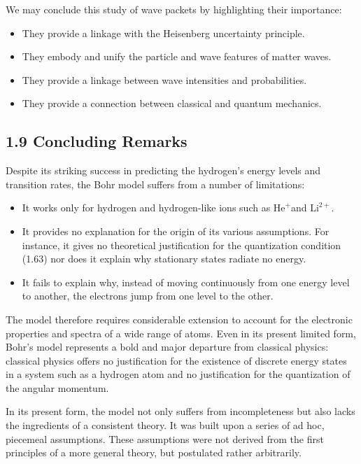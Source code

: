 \documentclass[10pt]{article}
\begin{document}
We may conclude this study of wave packets by highlighting their importance:

\begin{itemize}
  \item They provide a linkage with the Heisenberg uncertainty principle.
  \item They embody and unify the particle and wave features of matter waves.
  \item They provide a linkage between wave intensities and probabilities.
  \item They provide a connection between classical and quantum mechanics.
\end{itemize}

\subsection*{1.9 Concluding Remarks}
Despite its striking success in predicting the hydrogen's energy levels and transition rates, the Bohr model suffers from a number of limitations:

\begin{itemize}
  \item It works only for hydrogen and hydrogen-like ions such as $\mathrm{He}^{+}$and $\mathrm{Li}^{2+}$.
  \item It provides no explanation for the origin of its various assumptions. For instance, it gives no theoretical justification for the quantization condition (1.63) nor does it explain why stationary states radiate no energy.
  \item It fails to explain why, instead of moving continuously from one energy level to another, the electrons jump from one level to the other.
\end{itemize}

The model therefore requires considerable extension to account for the electronic properties and spectra of a wide range of atoms. Even in its present limited form, Bohr's model represents a bold and major departure from classical physics: classical physics offers no justification for the existence of discrete energy states in a system such as a hydrogen atom and no justification for the quantization of the angular momentum.

In its present form, the model not only suffers from incompleteness but also lacks the ingredients of a consistent theory. It was built upon a series of ad hoc, piecemeal assumptions. These assumptions were not derived from the first principles of a more general theory, but postulated rather arbitrarily.
\end{document}
